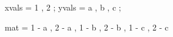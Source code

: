 xvals = 1 , 2 ;
yvals = a , b , c ;

%
mat = 1 - a , 2 - a , 
      1 - b , 2 - b , 
      1 - c , 2 - c
